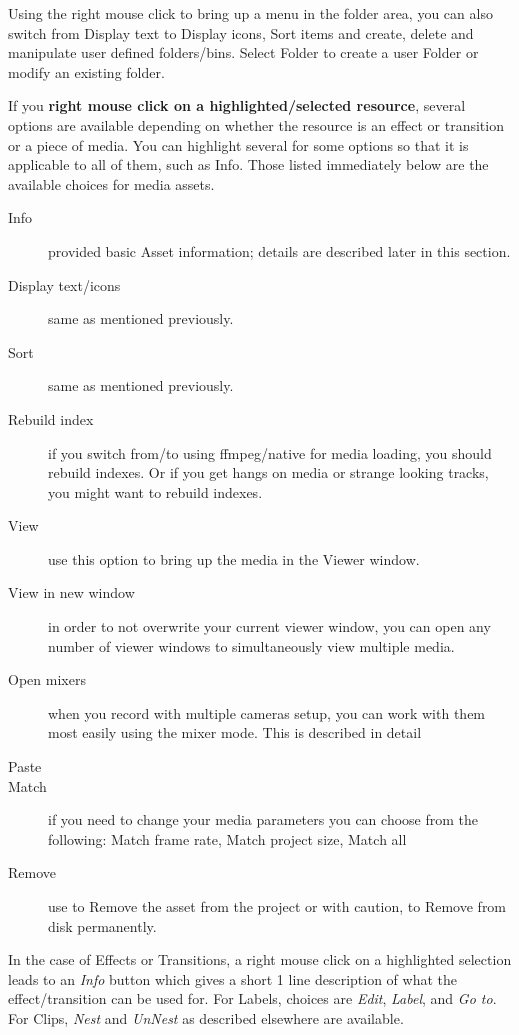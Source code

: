 Using the right mouse click to bring up a menu in the folder area, you can also switch from Display text to Display icons, Sort items and create, delete and manipulate user defined folders/bins. Select Folder to create a user Folder or modify an existing folder.

If you \textbf{right mouse click on a highlighted/selected resource}, several options are available depending on whether the resource is an effect or transition or a piece of media.  
You can highlight several for some options so that it is applicable to all of them, such as Info.  
Those listed immediately below are the available choices for media assets.


\begin{description}
    \item[Info]  provided basic Asset information; details are described later in this section.
    \item[Display text/icons]  same as mentioned previously.
    \item[Sort]  same as mentioned previously.
    \item[Rebuild index] if you switch from/to using ffmpeg/native for media loading, you should rebuild
        indexes.  Or if you get hangs on media or strange looking tracks, you might want to rebuild indexes.
    \item[View]  use this option to bring up the media in the Viewer window.
    \item[View in new window]  in order to not overwrite your current viewer window, you can open any
        number of viewer windows to simultaneously view multiple media.
    \item[Open mixers]  when you record with multiple cameras setup, you can work with them most easily
        using the mixer mode.  This is described in detail
    \item[Paste]  
    \item[Match]  if you need to change your media parameters you can choose from the following: Match frame
        rate, Match project size, Match all 
    \item[Remove]  use to Remove the asset from the project or with caution, to Remove from disk permanently.
\end{description}

In the case of Effects or Transitions, a right mouse click on a highlighted selection leads to an \emph{Info} button which gives a short 1 line description of what the effect/transition can be used for.
For Labels, choices are \emph{Edit}, \emph{Label}, and \emph{Go to}.
For Clips, \emph{Nest} and \emph{UnNest} as described elsewhere are available.

